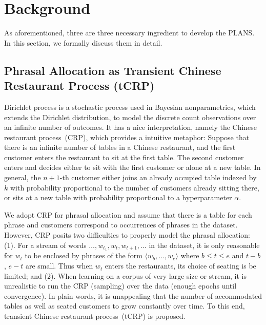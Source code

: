 \section{Background}

As aforementioned, three are three necessary ingredient to develop the PLANS. In
this section, we formally discuss them in detail.

\subsection{Phrasal Allocation as Transient Chinese Restaurant Process (tCRP)}

Dirichlet process is a stochastic process used in Bayesian nonparametrics, which
extends the Dirichlet distribution, to model the discrete count observations
over an infinite number of outcomes. It has a nice interpretation, namely the
Chinese restaurant process~(CRP), which provides a intuitive metaphor: Suppose
that there is an infinite number of tables in a Chinese restaurant, and the
first customer enters the restaurant to sit at the first table. The second
customer enters and decides either to sit with the first customer or alone at a
new table. In general, the $n+1$-th customer either joins an already occupied
table indexed by $k$ with probability proportional to the number of customers
already sitting there, or sits at a new table with probability proportional to a
hyperparameter $\alpha$.

We adopt CRP for phrasal allocation and assume that there is a table for each
phrase and customers correspond to occurrences of phrases in the dataset.
However, CRP posits two difficulties to properly model the phrasal allocation:
(1). For a stream of words $\dots, w_{t_1}, w_t, w_{t+1}, \dots$ in the dataset,
it is only reasonable for $w_t$ to be enclosed by phrases of the form $\langle
w_b, \dots, w_e \rangle$ where $b \le t \le e$ and $t - b$, $e - t$ are small.
Thus when $w_t$ enters the restaurants, its choice of seating is be limited; and
(2).  When learning on a corpus of very large size or stream, it is unrealistic
to run the CRP (sampling) over the data (enough epochs until convergence). In
plain words, it is unappealing that the number of accommodated tables as well as
seated customers to grow constantly over time. To this end, transient Chinese
restaurant process~(tCRP) is proposed.

